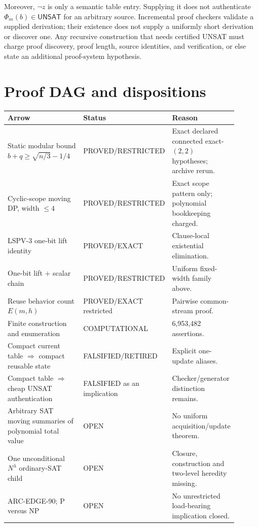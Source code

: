\documentclass[11pt]{article}
\begin{document}
Moreover, $\neg z$ is only a semantic table entry.  Supplying it does not authenticate $\Phi_m(b)\in\mathsf{UNSAT}$ for an arbitrary source.  Incremental proof checkers validate a supplied derivation; their existence does not supply a uniformly short derivation or discover one.  Any recursive construction that needs certified UNSAT must charge proof discovery, proof length, source identities, and verification, or else state an additional proof-system hypothesis.

\section{Proof DAG and dispositions}
\begin{center}
\begin{tabular}{p{0.47\linewidth}p{0.18\linewidth}p{0.25\linewidth}}
\toprule
Arrow & Status & Reason\\\midrule
Static modular bound $b+q\ge\sqrt{n/3}-1/4$ & PROVED/RESTRICTED & Exact declared connected exact-$(2,2)$ hypotheses; archive rerun.\\
Cyclic-scope moving DP, width $\le4$ & PROVED/RESTRICTED & Exact scope pattern only; polynomial bookkeeping charged.\\
LSPV-3 one-bit lift identity & PROVED/EXACT & Clause-local existential elimination.\\
One-bit lift $+$ scalar chain & PROVED/RESTRICTED & Uniform fixed-width family above.\\
Reuse behavior count $E(m,h)$ & PROVED/EXACT restricted & Pairwise common-stream proof.\\
Finite construction and enumeration & COMPUTATIONAL & 6,953,482 assertions.\\
Compact current table $\Rightarrow$ compact reusable state & FALSIFIED/RETIRED & Explicit one-update aliases.\\
Compact table $\Rightarrow$ cheap UNSAT authentication & FALSIFIED as an implication & Checker/generator distinction remains.\\
Arbitrary SAT moving summaries of polynomial total value & OPEN & No uniform acquisition/update theorem.\\
One unconditional $N^\lambda$ ordinary-SAT child & OPEN & Closure, construction and two-level heredity missing.\\
ARC-EDGE-90; P versus NP & OPEN & No unrestricted load-bearing implication closed.\\
\bottomrule
\end{tabular}
\end{center}
\end{document}
